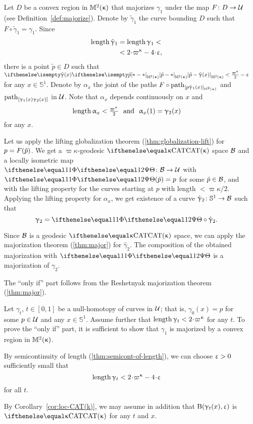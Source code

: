  Let $D$ be a convex region in $\mathbb{M}_{{}}^{2}({\upkappa})$ that majorizes $\gamma_1$ under the map $F\:D\to\spc{U}$ 
(see Definition~\ref{def:majorize}).
Denote by $\tilde \gamma_1$ 
the curve bounding $D$ 
such that $F\circ\tilde \gamma_1=\gamma_1$.
Since  
\begin{align*}
\length\tilde \gamma_1
&=
\length\gamma_1
<
\\
&<
2\cdot\varpi\kappa-4\cdot\eps,
\end{align*}
there is a point $\tilde p\in D$ such that 
$\dist{\tilde p}{\tilde \gamma(x)}{\Lob2\kappa}<\tfrac{\varpi\kappa}2-\eps$
for any $x\in\mathbb{S}^1$.
Denote by $\alpha_x$ the joint of the paths $F\circ\geodpath_{[p\tilde \gamma_1(x)]_{\Lob2\kappa}}$ 
and  $\mathrm{path}_{[\upgamma_1(x)\upgamma_2(x)]}$ in $\mathcal{U}$.
Note that $\alpha_x$ depends continuously on $x$ and
$$\length\alpha_x<\tfrac{\varpi\kappa}{2}\ \ \text{and}\ \ \alpha_x(1)=\gamma_2(x)$$ 
for any $x$.

Let us apply the lifting globalization theorem
(\ref{thm:globalization-lift}) for $p\z=F(\tilde p)$.
We get a $\varpi\kappa$-geodesic $\CAT\kappa$ space $\mathcal{B}$
and a locally isometric map $\map\:\spc{B}\to\spc{U}$
with $\map(\hat p)=p$ for some $\hat p \in \spc{B}$, and with the lifting property for the curves starting at $p$ with length $<\varpi\kappa/2$.
Applying the lifting property for $\alpha_x$, 
we get existence of a curve $\hat\gamma_2\:\mathbb{S}^1\to \spc{B}$ such that
$$\gamma_2=\map\circ\hat\gamma_2.$$

Since $\mathcal{B}$ is a geodesic $\CAT\kappa$ space, we can apply the majorization theorem (\ref{thm:major}) for $\hat\gamma_2$.
The composition of the obtained majorization with $\map$ is a majorization of $\gamma_2$.
\qeds

The ``only if'' part follows from the Reshetnyak majorization theorem (\ref{thm:major}).

Let  $\gamma_t$, $t\in[0,1]$ 
be a null-homotopy of curves in $\mathcal{U}$;
that is, $\gamma_0(x)=p$ for some $p\in \spc{U}$
and any $x\in\mathbb{S}^1$.
Assume further that $\length \gamma_t<2\cdot\varpi\kappa$ for any $t$.
To prove the ``only if'' part, it is sufficient to show that $\gamma_1$ is majorized by a convex region in $\mathbb{M}_{{}}^{2}({\upkappa})$. 

By semicontinuity of length (\ref{thm:semicont-of-length}),
we can choose  $\upvarepsilon>0$ sufficiently small that
$$\length \gamma_t<2\cdot\varpi\kappa-4\cdot\eps$$
for all $t$.

By Corollary~\ref{cor:loc-CAT(k)},
we may assume in addition that
$\mathrm{B}{}(\upgamma_t(x),\upvarepsilon)$ is $\CAT\kappa$ 
for any $t$ and $x$.

